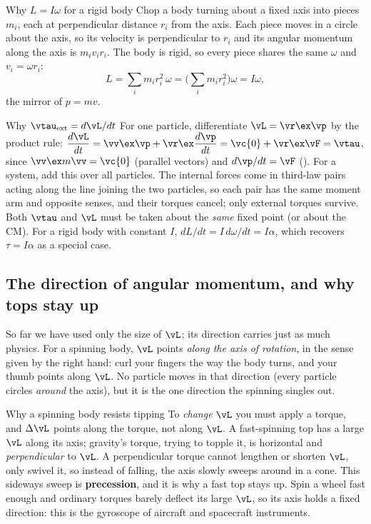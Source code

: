 \begin{derivbox}{Why $L=I\omega$ for a rigid body}
Chop a body turning about a fixed axis into pieces $m_i$, each at perpendicular distance $r_i$ from the
axis. Each piece moves in a circle about the axis, so its velocity is perpendicular to $r_i$ and its
angular momentum along the axis is $m_iv_ir_i$. The body is rigid, so every piece shares the same $\omega$
and $v_i=\omega r_i$:
\[
L=\sum_i m_i r_i^2\,\omega=\Big(\sum_i m_i r_i^2\Big)\omega=I\omega,
\]
the mirror of $p=mv$.
\end{derivbox}

\begin{derivbox}{Why $\vtau_{\text{ext}}=d\vL/dt$}
For one particle, differentiate $\vL=\vr\ex\vp$ by the product rule:
$\dfrac{d\vL}{dt}=\vv\ex\vp+\vr\ex\dfrac{d\vp}{dt}=\vc{0}+\vr\ex\vF=\vtau$, since $\vv\ex m\vv=\vc{0}$
(parallel vectors) and $d\vp/dt=\vF$ (). For a system, add this over all particles. The
internal forces come in third-law pairs acting along the line joining the two particles, so each pair has
the same moment arm and opposite senses, and their torques cancel; only external torques survive. Both
$\vtau$ and $\vL$ must be taken about the \emph{same} fixed point (or about the CM). For a rigid body with
constant $I$, $dL/dt=I\,d\omega/dt=I\alpha$, which recovers $\tau=I\alpha$ as a special case.
\end{derivbox}

\subsection{The direction of angular momentum, and why tops stay up}

So far we have used only the size of $\vL$; its direction carries just as much physics. For a spinning body, $\vL$ points \emph{along the axis of rotation}, in the sense given by the right hand:
curl your fingers the way the body turns, and your thumb points along $\vL$. No particle moves in that
direction (every particle circles \emph{around} the axis), but it is the one direction the spinning
singles out.

\begin{remarkbox}{Why a spinning body resists tipping}
To \emph{change} $\vL$ you must apply a torque, and $\Delta\vL$ points along the torque, not along $\vL$.
A fast-spinning top has a large $\vL$ along its axis; gravity's torque, trying to topple it, is horizontal
and \emph{perpendicular} to $\vL$. A perpendicular torque cannot lengthen or shorten $\vL$, only swivel
it, so instead of falling, the axis slowly sweeps around in a cone. This sideways sweep is
\textbf{precession}, and it is why a fast top stays up. Spin a wheel fast enough and ordinary torques
barely deflect its large $\vL$, so its axis holds a fixed direction: this is the gyroscope of aircraft and
spacecraft instruments.
\end{remarkbox}

